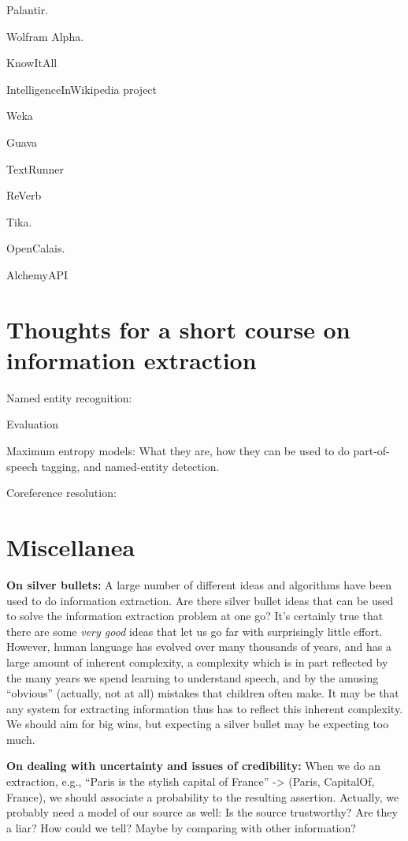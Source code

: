 Palantir. 

Wolfram Alpha.

KnowItAll

IntelligenceInWikipedia project

Weka

Guava

TextRunner

ReVerb

Tika.

OpenCalais.

AlchemyAPI



\section{Thoughts for a short course on information extraction}

Named entity recognition:

Evaluation 

Maximum entropy models: What they are, how they can be used to do
part-of-speech tagging, and named-entity detection.

Coreference resolution: 

\section{Miscellanea}

\textbf{On silver bullets:} A large number of different ideas and
algorithms have been used to do information extraction.  Are there
silver bullet ideas that can be used to solve the information
extraction problem at one go?  It's certainly true that there are some
\emph{very good} ideas that let us go far with surprisingly little
effort.  However, human language has evolved over many thousands of
years, and has a large amount of inherent complexity, a complexity
which is in part reflected by the many years we spend learning to
understand speech, and by the amusing ``obvious'' (actually, not at
all) mistakes that children often make.  It may be that any system for
extracting information thus has to reflect this inherent complexity.
We should aim for big wins, but expecting a silver bullet may be
expecting too much.

\textbf{On dealing with uncertainty and issues of credibility:} When
we do an extraction, e.g., ``Paris is the stylish capital of France''
-> (Paris, CapitalOf, France), we should associate a probability to
the resulting assertion.  Actually, we probably need a model of our
source as well: Is the source trustworthy?  Are they a liar?  How
could we tell?  Maybe by comparing with other information?

